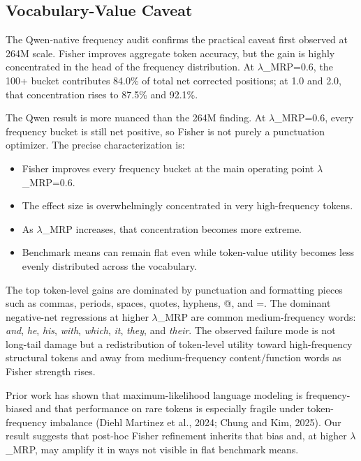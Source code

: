 \documentclass[
  11pt,
]{article}
\providecommand{\tightlist}{%
  \setlength{\itemsep}{0pt}\setlength{\parskip}{0pt}}
\begin{document}
\hypertarget{vocabulary-value-caveat}{%
\subsection{Vocabulary-Value Caveat}\label{vocabulary-value-caveat}}

The Qwen-native frequency audit confirms the practical caveat first
observed at 264M scale. Fisher improves aggregate token accuracy, but
the gain is highly concentrated in the head of the frequency
distribution. At $\lambda$\_MRP=0.6, the 100+ bucket contributes 84.0\% of total
net corrected positions; at 1.0 and 2.0, that concentration rises to
87.5\% and 92.1\%.

The Qwen result is more nuanced than the 264M finding. At $\lambda$\_MRP=0.6,
every frequency bucket is still net positive, so Fisher is not purely a
punctuation optimizer. The precise characterization is:

\begin{itemize}
\tightlist
\item
  Fisher improves every frequency bucket at the main operating point
  $\lambda$\_MRP=0.6.
\item
  The effect size is overwhelmingly concentrated in very high-frequency
  tokens.
\item
  As $\lambda$\_MRP increases, that concentration becomes more extreme.
\item
  Benchmark means can remain flat even while token-value utility becomes
  less evenly distributed across the vocabulary.
\end{itemize}

The top token-level gains are dominated by punctuation and formatting
pieces such as commas, periods, spaces, quotes, hyphens, @, and =. The
dominant negative-net regressions at higher $\lambda$\_MRP are common
medium-frequency words: \emph{and}, \emph{he}, \emph{his}, \emph{with},
\emph{which}, \emph{it}, \emph{they}, and \emph{their}. The observed
failure mode is not long-tail damage but a redistribution of token-level
utility toward high-frequency structural tokens and away from
medium-frequency content/function words as Fisher strength rises.

Prior work has shown that maximum-likelihood language modeling is
frequency-biased and that performance on rare tokens is especially
fragile under token-frequency imbalance (Diehl Martinez et al., 2024;
Chung and Kim, 2025). Our result suggests that post-hoc Fisher
refinement inherits that bias and, at higher $\lambda$\_MRP, may amplify it in
ways not visible in flat benchmark means.
\end{document}
